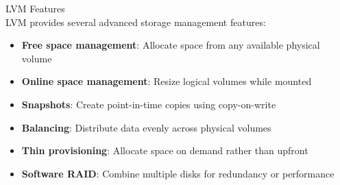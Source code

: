 \begin{definition}{LVM Features}\\
    LVM provides several advanced storage management features:
    \begin{itemize}
        \item \textbf{Free space management}: Allocate space from any available physical volume
        \item \textbf{Online space management}: Resize logical volumes while mounted
        \item \textbf{Snapshots}: Create point-in-time copies using copy-on-write
        \item \textbf{Balancing}: Distribute data evenly across physical volumes
        \item \textbf{Thin provisioning}: Allocate space on demand rather than upfront
        \item \textbf{Software RAID}: Combine multiple disks for redundancy or performance
    \end{itemize}
\end{definition}

